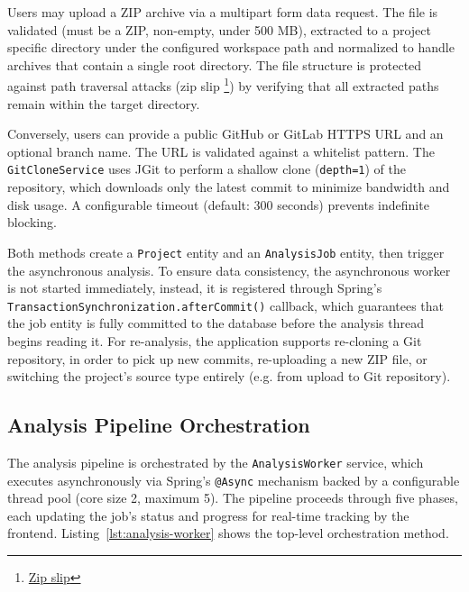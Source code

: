 \par Users may upload a ZIP archive via a multipart form data request. The file is validated (must be a ZIP, non-empty, under 500 MB), extracted to a project specific directory under the configured workspace path and normalized to handle archives that contain a single root directory. The file structure is protected against path traversal attacks (zip slip \footnote{\href{https://maven.apache.org/security-plexus-archiver.html}{Zip slip}}) by verifying that all extracted paths remain within the target directory.

\par Conversely, users can provide a public GitHub or GitLab HTTPS URL and an optional branch name. The URL is validated against a whitelist pattern. The \texttt{Git\-Clone\-Ser\-vice} uses JGit to perform a shallow clone (\texttt{depth=1}) of the repository, which downloads only the latest commit to minimize bandwidth and disk usage. A configurable timeout (default: 300 seconds) prevents indefinite blocking.

Both methods create a \texttt{Project} entity and an \texttt{AnalysisJob} entity, then trigger the asynchronous analysis. To ensure data consistency, the asynchronous worker is not started immediately, instead, it is registered through Spring's \texttt{Tran\-sac\-tionSyn\-chron\-i\-zation.afterCommit()} callback, which guarantees that the job entity is fully committed to the database before the analysis thread begins reading it. For re-analysis, the application supports re-cloning a Git repository, in order to pick up new commits, re-uploading a new ZIP file, or switching the project's source type entirely (e.g. from upload to Git repository).

\subsection{Analysis Pipeline Orchestration}
\label{subsec: analysis-pipeline}

\par The analysis pipeline is orchestrated by the \texttt{AnalysisWorker} service, which executes asynchronously via Spring's \texttt{@Async} mechanism backed by a configurable thread pool (core size 2, maximum 5). The pipeline proceeds through five phases, each updating the job's status and progress for real-time tracking by the frontend. Listing~\ref{lst:analysis-worker} shows the top-level orchestration method.

